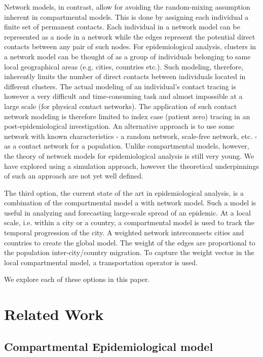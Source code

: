 \documentclass[10pt, journal,onecolumn]{IEEEtran}
\begin{document}
Network models, in contrast, allow for avoiding the random-mixing assumption inherent in compartmental
models. This is done by assigning each individual a finite set of permanent contacts. Each
individual in a network model can be represented as a node in a network while the edges represent
the potential direct contacts between any pair of such nodes. For epidemiological analysis, clusters
in a network model can be thought of as a group of individuals belonging to same local geographical
areas (e.g. cities, countries etc.). Such modeling, therefore, inherently limits the number of
direct contacts between individuals located in different clusters. The actual modeling of an
individual's contact tracing is however a very difficult and time-consuming task and almost
impossible at a large scale (for physical contact networks).
The application of such contact network modeling is therefore limited
to index case (patient zero) tracing in an post-epidemiological investigation. An alternative
approach is to use some network with known characteristics - a random network, scale-free network,
etc. - as a contact network for a population. Unlike compartmental models, however, the theory of
network models for epidemiological analysis is still very young. We have explored using a
simulation approach, however the theoretical underpinnings of such an approach are not yet well defined.

The third option, the current state of the art in epidemiological analysis, is a combination of the
compartmental model a with network model. Such a model is useful in analyzing and forecasting
large-scale spread of an epidemic. At a local scale, i.e. within a city or a country, a compartmental
model is used to track the temporal progression of the city. A weighted network interconnects
cities and countries to create the global model. The weight of the edges are proportional to the
population inter-city/country migration. To capture the weight vector in the local compartmental
model, a transportation operator is used.

We explore each of these options in this paper.



\section{{Related Work}}
\label{sec:RelatedWork}

\subsection{Compartmental Epidemiological model}
\label{SubSec:SIR}
\end{document}
